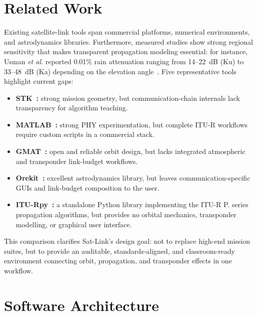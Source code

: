 \documentclass[telecom,article,submit,pdftex,moreauthors]{Definitions/mdpi}
\begin{document}
\section{Related Work}

Existing satellite-link tools span commercial platforms, numerical environments,
and astrodynamics libraries. Furthermore, measured studies show strong regional
sensitivity that makes transparent propagation modeling essential: for instance,
Usman \emph{et al.} reported 0.01\% rain attenuation ranging from 14--22~dB (Ku)
to 33--48~dB (Ka) depending on the elevation angle~\cite{usman2019_rain}.
Five representative tools highlight current gaps:

\begin{itemize}[leftmargin=*,nosep]
  \item \textbf{STK~\cite{ansys_stk}:} strong mission geometry, but
        communication-chain internals lack transparency for algorithm teaching.
  \item \textbf{MATLAB~\cite{mathworks_satcom}:} strong PHY experimentation,
        but complete ITU-R workflows require custom scripts in a commercial stack.
  \item \textbf{GMAT~\cite{nasa_gmat}:} open and reliable orbit design, but
        lacks integrated atmospheric and transponder link-budget workflows.
  \item \textbf{Orekit~\cite{orekit}:} excellent astrodynamics library, but
        leaves communication-specific GUIs and link-budget composition to the user.
  \item \textbf{ITU-Rpy~\cite{iturpy}:} a standalone Python library implementing
        the ITU-R P. series propagation algorithms, but provides no orbital
        mechanics, transponder modelling, or graphical user interface.
\end{itemize}


This comparison clarifies Sat-Link's design goal: not to replace high-end mission
suites, but to provide an auditable, standards-aligned, and classroom-ready
environment connecting orbit, propagation, and transponder effects in one workflow.

\section{Software Architecture}
\label{sec:architecture}
\end{document}
